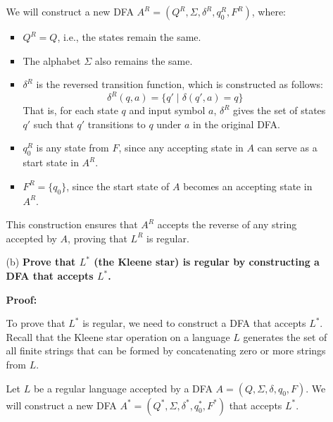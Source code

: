 \documentclass[9pt,tikz,border=2mm]{article}
\begin{document}
\begin{enumerate}
\begin{enumerate}
    We will construct a new DFA \( A^R = (Q^R, \Sigma, \delta^R, q_0^R, F^R) \), where:
    
    \begin{itemize}
        \item \( Q^R = Q \), i.e., the states remain the same.
        \item The alphabet \( \Sigma \) also remains the same.
        \item \( \delta^R \) is the reversed transition function, which is constructed as follows:
        \[
        \delta^R(q, a) = \{ q' \mid \delta(q', a) = q \}
        \]
        That is, for each state \( q \) and input symbol \( a \), \( \delta^R \) gives the set of states \( q' \) such that \( q' \) transitions to \( q \) under \( a \) in the original DFA.
        \item \( q_0^R \) is any state from \( F \), since any accepting state in \( A \) can serve as a start state in \( A^R \).
        \item \( F^R = \{q_0\} \), since the start state of \( A \) becomes an accepting state in \( A^R \).
    \end{itemize}
    
    This construction ensures that \( A^R \) accepts the reverse of any string accepted by \( A \), proving that \( L^R \) is regular.

    \vspace{1em}
    
    \item[(b)] \textbf{Prove that \( L^* \) (the Kleene star) is regular by constructing a DFA that accepts \( L^* \).}

    \textbf{Proof:}

    To prove that \( L^* \) is regular, we need to construct a DFA that accepts \( L^* \). Recall that the Kleene star operation on a language \( L \) generates the set of all finite strings that can be formed by concatenating zero or more strings from \( L \).

    Let \( L \) be a regular language accepted by a DFA \( A = (Q, \Sigma, \delta, q_0, F) \). We will construct a new DFA \( A^* = (Q^*, \Sigma, \delta^*, q_0^*, F^*) \) that accepts \( L^* \).


\end{enumerate}
\end{enumerate}
\end{document}
